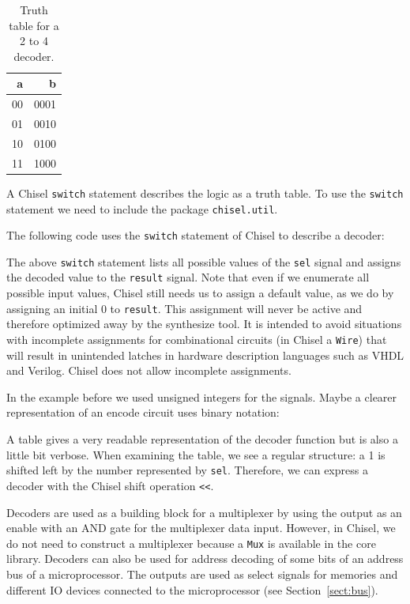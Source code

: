\documentclass[%
    10pt,
    headinclude, footexclude,
    openright, %
    notitlepage,
    cleardoubleempty,
    headsepline,
    pointlessnumbers,
    bibtotoc, idxtotoc,
    ]{scrbook}
\newcommand{\code}[1]{{\lstinline[basicstyle=\small\ttfamily]{#1}}}
\begin{document}
\begin{table}
 \centering
  \begin{tabular}{rr}
    \toprule
    a & b \\
    \midrule
    00 & 0001 \\
    01 & 0010 \\
    10 & 0100 \\
    11 & 1000 \\
    \bottomrule
  \end{tabular}
  \caption{Truth table for a 2 to 4 decoder.}
 \label{tab:decoder}
\end{table}

A Chisel \code{switch} statement describes the logic as a truth table.
To use the \code{switch} statement we need to include the package \code{chisel.util}.


\noindent The following code uses the \code{switch} statement of Chisel to describe a decoder:



\noindent The above \code{switch} statement lists all possible values of the \code{sel} signal
and assigns the decoded value to the \code{result} signal.
Note that even if we enumerate all possible input values, Chisel still needs us to assign a
default value, as we do by assigning an initial 0 to \code{result}.
This assignment will never be active and therefore optimized away by the synthesize tool.
It is intended to avoid situations with incomplete assignments for combinational circuits
(in Chisel a \code{Wire}) that will result in unintended latches in hardware description
languages such as VHDL and Verilog. Chisel does not allow incomplete assignments.

In the example before we used unsigned integers for the signals. Maybe a clearer representation
of an encode circuit uses binary notation:



A table gives a very readable representation of the decoder function but is also
a little bit verbose.
When examining the table, we see a regular structure: a 1 is shifted left by the number
represented by \code{sel}. Therefore, we can express a decoder with the Chisel shift
operation \code{<<}.


Decoders are used as a building block for a multiplexer by using the output as an enable
with an AND gate for the multiplexer data input. However, in Chisel, we do not need to construct
a multiplexer because a \code{Mux} is available in the core library.
Decoders can also be used for address decoding of some bits of an address bus of
a microprocessor. The outputs are used as
select signals for memories and different IO devices connected to the microprocessor
(see Section~\ref{sect:bus}).
\end{document}
